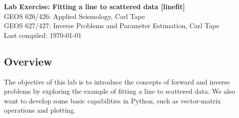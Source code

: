 \documentclass[11pt,titlepage,fleqn]{article}
\begin{document}

\begin{spacing}{1.2}
\centering
{\large \bf Lab Exercise: Fitting a line to scattered data [linefit]} \\
GEOS 626/426: Applied Seismology, Carl Tape \\
GEOS 627/427: Inverse Problems and Parameter Estimation, Carl Tape \\
Last compiled: \today
\end{spacing}


\vspace{-0.5cm}
\subsection*{Overview}

The objective of this lab is to introduce the concepts of forward and inverse problems by exploring the example of fitting a line to scattered data. We also want to develop some basic capabilities in Python, such as vector-matrix operations and plotting.
\end{document}
